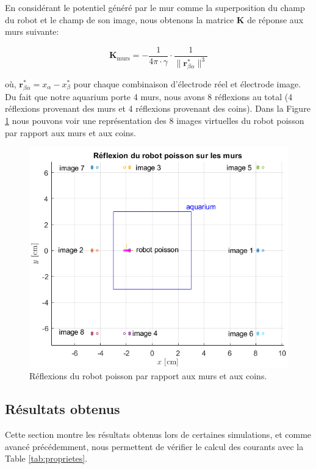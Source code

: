 En considérant le potentiel généré par le mur comme la superposition du champ du robot et le champ de son image, nous obtenons la matrice $\mathbf{K}$ de réponse aux murs suivante: 

\begin{equation}
    \mathbf{K}_{\text{murs}} = - \frac{1}{4\pi \cdot \gamma} \cdot \frac{1}{\lVert \mathbf{r}_{\beta\alpha}^* \rVert^3}
\end{equation}

où, $\mathbf{r}_{\beta\alpha}^* = x_\alpha - x_\beta^*$ pour chaque combinaison d'électrode réel et électrode image. Du fait que notre aquarium porte 4 murs, nous avons 8 réflexions au total (4 réflexions provenant des murs et 4 réflexions provenant des coins). Dans la Figure \ref{fig:wall_reflexion} nous pouvons voir une représentation des 8 images virtuelles du robot poisson par rapport aux murs et aux coins. 

\begin{figure}
    \centering
    \includegraphics[scale=0.8]{assets/wall_reflexions/wall_reflexion.png}
    \caption{Réflexions du robot poisson par rapport aux murs et aux coins.}
    \label{fig:wall_reflexion}
\end{figure}
\clearpage

\subsection{Résultats obtenus} \label{sec:resultats}
Cette section montre les résultats obtenus lors de certaines simulations, et comme avancé précédemment, nous permettent de vérifier le calcul des courants avec la Table \ref{tab:proprietes}. 
